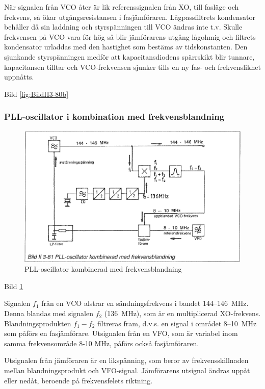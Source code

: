 När signalen från VCO åter är lik referenssignalen från XO, till
fasläge och frekvens, så ökar utgångsresistansen i
fasjämföraren. Lågpassfiltrets kondensator behåller då sin laddning
och styrspänningen till VCO ändras inte t.v. Skulle frekvensen på VCO
vara för hög så blir jämförarens utgång lågohmig och filtrets
kondensator urladdas med den hastighet som bestäms av tidskonstanten.
Den sjunkande styrspänningen medför att kapacitansdiodens
spärrskikt blir tunnare, kapacitansen tilltar och VCO-frekvensen
sjunker tills en ny fas- och frekvenslikhet uppnåtts.

Bild \ref{fig:BildII3-80b}

\subsubsection{PLL-oscillator i kombination med frekvensblandning}

\begin{figure}
\includegraphics[width=\textwidth]{images/bild_2_3-81}
\caption{PLL-oscillator kombinerad med frekvensblandning}
\label{fig:BildII3-81}
\end{figure}

Bild \ref{fig:BildII3-81}

Signalen \(f_1\) från en VCO alstrar en sändningsfrekvens i bandet
144--146~MHz. Denna blandas med signalen \(f_2\) (136~MHz), som är en
multiplicerad XO-frekvens. Blandningsprodukten \(f_1 - f_2\) filtreras
fram, d.v.s. en signal i området 8--10~MHz som påförs en fasjämförare.
Utsignalen från en VFO, som är variabel inom samma frekvensområde 8-10
MHz, påförs också fasjämföraren.

Utsignalen från jämföraren är en likspänning, som beror av
frekvensskillnaden mellan blandningsprodukt och
VFO-signal. Jämförarens utsignal ändras uppåt eller nedåt, beroende på
frekvensfelets riktning.

